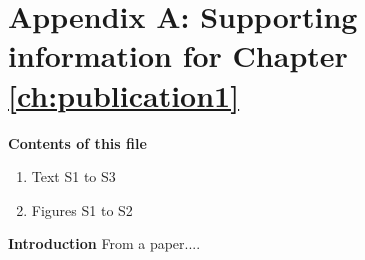 \onehalfspacing
\chapter*{Appendix A: Supporting information for Chapter \ref{ch:publication1}}


\noindent\textbf{Contents of this file}
\begin{enumerate}
\item Text S1 to S3
\item Figures S1 to S2
\end{enumerate}



\noindent\textbf{Introduction}
From a paper....
